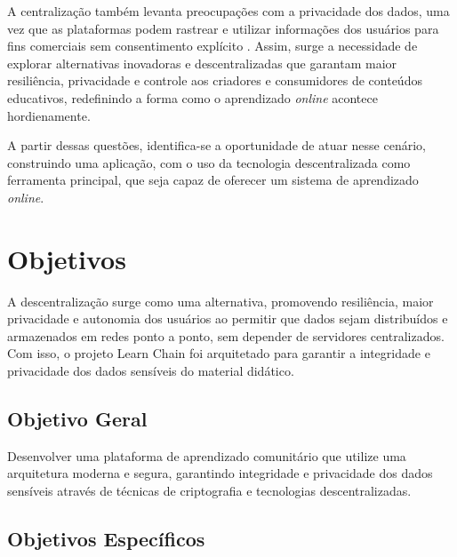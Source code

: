 A centralização também levanta preocupações com a privacidade dos dados, uma vez que as plataformas podem rastrear e utilizar informações dos usuários para fins comerciais sem consentimento explícito \cite{beiro2020}. Assim, surge a necessidade de explorar alternativas inovadoras e descentralizadas que garantam maior resiliência, privacidade e controle aos criadores e consumidores de conteúdos educativos, redefinindo a forma como o aprendizado \textit{online} acontece hordienamente.

A partir dessas questões, identifica-se a oportunidade de atuar nesse cenário, construindo uma aplicação, com o uso da tecnologia descentralizada como ferramenta principal, que seja capaz de oferecer um sistema de aprendizado \textit{online}.

\section{Objetivos}

A descentralização surge como uma alternativa, promovendo resiliência, maior privacidade e autonomia dos usuários ao permitir que dados sejam distribuídos e armazenados em redes ponto a ponto, sem depender de servidores centralizados. Com isso, o projeto Learn Chain foi arquitetado para garantir a integridade e privacidade dos dados sensíveis do material didático. 

\subsection{Objetivo Geral}

Desenvolver uma plataforma de aprendizado comunitário que utilize uma arquitetura moderna e segura, garantindo integridade e privacidade dos dados sensíveis através de técnicas de criptografia e tecnologias descentralizadas.

\subsection{Objetivos Específicos}

